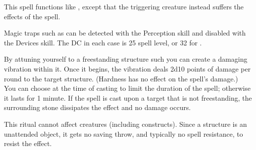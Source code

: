 \begin{spelleffect}
This spell functions like , except that the triggering creature instead suffers the effects of the  spell.
\end{spelleffect}
\begin{spellnotes}
Magic traps such as  can be detected with the Perception skill and disabled with the Devices skill. The DC in each case is 25 \add spell level, or 32 for .
\end{spellnotes}

\begin{spelleffect}
By attuning yourself to a freestanding structure such you can create a damaging vibration within it. Once it begins, the vibration deals 2d10 points of damage per round to the target structure. (Hardness has no effect on the spell's damage.) You can choose at the time of casting to limit the duration of the spell; otherwise it lasts for 1 minute. If the spell is cast upon a target that is not freestanding, the surrounding stone dissipates the effect and no damage occurs.
\end{spelleffect}
\begin{spellnotes}
This ritual cannot affect creatures (including constructs). Since a structure is an unattended object, it gets no saving throw, and typically no spell resistance, to resist the effect.
\end{spellnotes}

